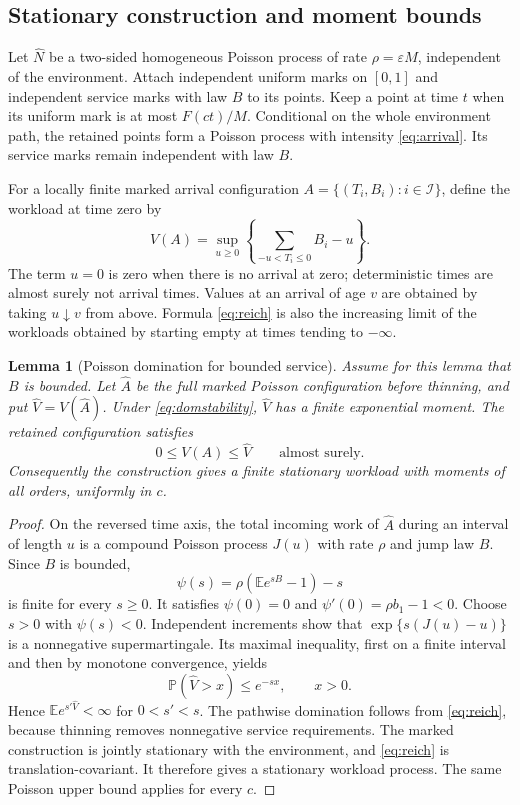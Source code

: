 \documentclass[10pt,a4paper]{amsart}
\numberwithin{equation}{section}
\newtheorem{lemma}[theorem]{Lemma}
\newcommand{\E}{\mathbb E}
\newcommand{\Pp}{\mathbb P}
\newcommand{\1}{\mathbf 1}
\newcommand{\eps}{\varepsilon}
\begin{document}
\subsection{Stationary construction and moment bounds}
Let $\widehat N$ be a two-sided homogeneous Poisson process of rate $\rho=\eps M$, independent of the environment. Attach independent uniform marks on $[0,1]$ and independent service marks with law $B$ to its points. Keep a point at time $t$ when its uniform mark is at most $F(ct)/M$. Conditional on the whole environment path, the retained points form a Poisson process with intensity \eqref{eq:arrival}. Its service marks remain independent with law $B$.

For a locally finite marked arrival configuration $A=\{(T_i,B_i):i\in\mathcal I\}$, define the workload at time zero by
\begin{equation}\label{eq:reich}
 V(A)=\sup_{u\ge0}\left\{\sum_{-u<T_i\le0}B_i-u\right\}.
\end{equation}
The term $u=0$ is zero when there is no arrival at zero; deterministic times are almost surely not arrival times. Values at an arrival of age $v$ are obtained by taking $u\downarrow v$ from above. Formula \eqref{eq:reich} is also the increasing limit of the workloads obtained by starting empty at times tending to $-\infty$.

\begin{lemma}[Poisson domination for bounded service]\label{lem:domination}
Assume for this lemma that $B$ is bounded. Let $\widehat A$ be the full marked Poisson configuration before thinning, and put $\widehat V=V(\widehat A)$. Under \eqref{eq:domstability}, $\widehat V$ has a finite exponential moment. The retained configuration satisfies
\[
 0\le V(A)\le\widehat V\qquad\text{almost surely}.
\]
Consequently the construction gives a finite stationary workload with moments of all orders, uniformly in $c$.
\end{lemma}
\begin{proof}
On the reversed time axis, the total incoming work of $\widehat A$ during an interval of length $u$ is a compound Poisson process $J(u)$ with rate $\rho$ and jump law $B$. Since $B$ is bounded,
\[
 \psi(s)=\rho(\E e^{sB}-1)-s
\]
is finite for every $s\ge0$. It satisfies $\psi(0)=0$ and $\psi'(0)=\rho b_1-1<0$. Choose $s>0$ with $\psi(s)<0$. Independent increments show that $\exp\{s(J(u)-u)\}$ is a nonnegative supermartingale. Its maximal inequality, first on a finite interval and then by monotone convergence, yields
\[
 \Pp(\widehat V>x)\le e^{-sx},\qquad x>0.
\]
Hence $\E e^{s'\widehat V}<\infty$ for $0<s'<s$. The pathwise domination follows from \eqref{eq:reich}, because thinning removes nonnegative service requirements. The marked construction is jointly stationary with the environment, and \eqref{eq:reich} is translation-covariant. It therefore gives a stationary workload process. The same Poisson upper bound applies for every $c$.
\end{proof}
\end{document}
